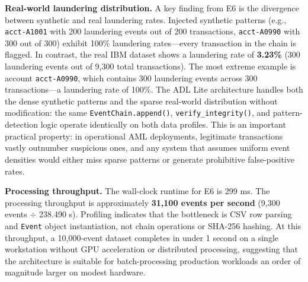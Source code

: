 \textbf{Real-world laundering distribution.} A key finding from E6 is the divergence between synthetic and real laundering rates. Injected synthetic patterns (e.g., \texttt{acct-A1001} with 200 laundering events out of 200 transactions, \texttt{acct-A0990} with 300 out of 300) exhibit 100\% laundering rates---every transaction in the chain is flagged. In contrast, the real IBM dataset shows a laundering rate of \textbf{3.23\%} (300 laundering events out of 9,300 total transactions). The most extreme example is account \texttt{acct-A0990}, which contains 300 laundering events across 300 transactions---a laundering rate of 100\%. The ADL Lite architecture handles both the dense synthetic patterns and the sparse real-world distribution without modification: the same \texttt{EventChain.append()}, \texttt{verify\_integrity()}, and pattern-detection logic operate identically on both data profiles. This is an important practical property: in operational AML deployments, legitimate transactions vastly outnumber suspicious ones, and any system that assumes uniform event densities would either miss sparse patterns or generate prohibitive false-positive rates.

\textbf{Processing throughput.} The wall-clock runtime for E6 is 299 ms. The processing throughput is approximately \textbf{31,100 events per second} (9,300 events \(\div\) 238.490 s). Profiling indicates that the bottleneck is CSV row parsing and \texttt{Event} object instantiation, not chain operations or SHA-256 hashing. At this throughput, a 10,000-event dataset completes in under 1 second on a single workstation without GPU acceleration or distributed processing, suggesting that the architecture is suitable for batch-processing production workloads an order of magnitude larger on modest hardware.
